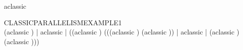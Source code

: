 \begin{circus}
 \circchannel aclassic \\
\end{circus}

\begin{circus}
 \circprocess CLASSICPARALLELISMEXAMPLE1 \circdef \circbegin \\
 \circspot (aclassic \then \Skip) \lpar | \lchanset aclassic \rchanset | \rpar
    ((aclassic \then \Skip) \interleave (((aclassic \then \Skip) \interleave (aclassic \then \Skip)) \lpar | \lchanset aclassic \rchanset | \rpar (aclassic \then \Skip) \interleave (aclassic \then \Skip))) \\
 \circend \\
\end{circus}
